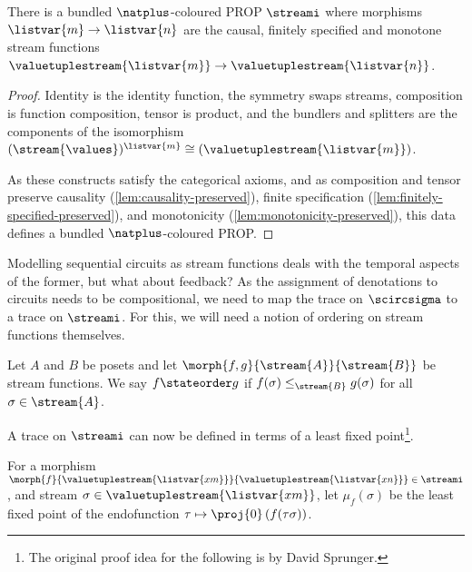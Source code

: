 \begin{proposition}
    There is a bundled \(\natplus\)-coloured PROP \(\streami\) where morphisms
    \(\listvar{m} \to \listvar{n}\) are the causal, finitely specified and
    monotone stream functions \(
        \valuetuplestream{\listvar{m}} \to \valuetuplestream{\listvar{n}}
    \).
\end{proposition}
\begin{proof}
    Identity is the identity function, the symmetry swaps streams, composition
    is function composition, tensor is product, and the bundlers and splitters
    are the components of the isomorphism \(
        (\stream{\values})^{\listvar{m}}
        \cong
        (\valuetuplestream{\listvar{m}})
    \).

    As these constructs satisfy the categorical axioms, and as composition and
    tensor preserve causality (\cref{lem:causality-preserved}),
    finite specification (\cref{lem:finitely-specified-preserved}),
    and monotonicity (\cref{lem:monotonicity-preserved}), this data defines a
    bundled \(\natplus\)-coloured PROP.
\end{proof}

Modelling sequential circuits as stream functions deals with the temporal
aspects of the former, but what about feedback?
As the assignment of denotations to circuits needs to be compositional, we need
to map the trace on \(\scircsigma\) to a trace on \(\streami\).
For this, we will need a notion of ordering on stream functions themselves.

\begin{definition}\label{def:state-order}
    Let \(A\) and \(B\) be posets and let
    \(\morph{f, g}{\stream{A}}{\stream{B}}\) be stream functions.
    We say \(f \stateorder g\) if \(f(\sigma) \leq_{\stream{B}} g(\sigma)\)
    for all \(\sigma \in \stream{A}\).
\end{definition}

A trace on \(\streami\) can now be defined in terms of a least fixed
point\footnote{The original proof idea for the following is by David Sprunger.}.

\begin{notation}
    For a morphism \(
        \morph{f}{\valuetuplestream{\listvar{xm}}}{\valuetuplestream{\listvar{xn}}}
        \in \streami
    \), and stream \(\sigma \in \valuetuplestream{\listvar{xm}}\), let
    \(\mu_f(\sigma)\) be the least fixed point of the endofunction \(
        \tau \mapsto \proj{0}\left(f(\tau\sigma)\right)
    \).
\end{notation}

